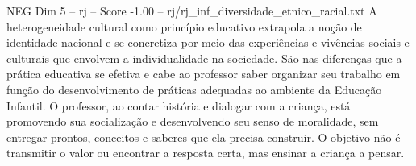 \begin{textsample}{NEG Dim 5 – rj – Score -1.00 – rj/rj\_inf\_diversidade\_etnico\_racial.txt}
A heterogeneidade cultural como princípio educativo extrapola a noção de identidade nacional e se concretiza por meio das experiências e vivências sociais e culturais que envolvem a individualidade na sociedade.
São nas diferenças que a prática educativa se efetiva e cabe ao professor saber organizar seu trabalho em função do desenvolvimento de práticas adequadas ao ambiente da Educação Infantil.
O professor, ao contar história e dialogar com a criança, está promovendo sua socialização e desenvolvendo seu senso de moralidade, sem entregar prontos, conceitos e saberes que ela precisa construir.
O objetivo não é transmitir o valor ou encontrar a resposta certa, mas ensinar a criança a pensar.

\end{textsample}
